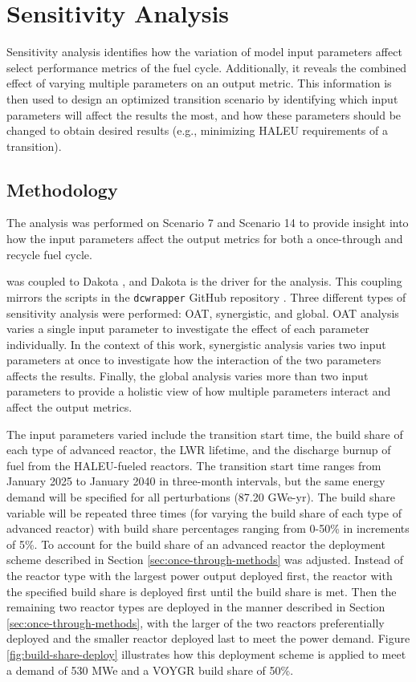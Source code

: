 \section{Sensitivity Analysis}
Sensitivity analysis identifies how the variation of model input
parameters affect select performance 
metrics of the fuel cycle. Additionally, it reveals the combined effect 
of varying multiple parameters on 
an output metric. This information is then used to design 
an optimized transition scenario by identifying which input parameters 
will affect the results the most, and how these parameters should be 
changed to obtain desired results (e.g., minimizing \gls{HALEU} requirements
of a transition). 

\subsection{Methodology}
The analysis was performed on Scenario 7 and Scenario 
14 to provide insight into how the input parameters affect the output 
metrics for both a once-through and recycle fuel cycle. 

\Cyclus was coupled to Dakota \cite{adams_dakota_2019},
and Dakota is the driver for the analysis. This coupling mirrors  
the scripts in the \texttt{dcwrapper} GitHub repository \cite{chee_arfc/dcwrapper_2019}.
Three different types 
of sensitivity analysis were performed: \acrfull{OAT}, synergistic, 
and global. \gls{OAT} analysis varies a single input parameter to 
investigate the effect of each parameter individually. In the context of 
this work, synergistic 
analysis varies two input parameters at once to investigate how the 
interaction of the two parameters affects the results. Finally, the global 
analysis varies more than two input parameters to provide a holistic 
view of how multiple parameters interact and affect the output metrics. 

The input parameters varied include the transition 
start time, the build share of each type of advanced reactor, 
the \gls{LWR} lifetime, and the discharge burnup of fuel from the 
\gls{HALEU}-fueled reactors. The transition start time ranges from January 
2025 to January 2040 in three-month intervals, but the same energy demand 
will be specified for all perturbations (87.20 GWe-yr). The build share 
variable will be repeated three times (for varying the build share of each 
type of advanced reactor) with build share percentages ranging from 0-50\% 
in increments of 5\%. To account for the build share of an advanced reactor
the deployment scheme described in Section \ref{sec:once-through-methods}
was adjusted. Instead of the reactor type with the largest power output 
deployed first, the reactor with the specified build share is deployed first 
until the build share is met. Then the remaining two reactor types are 
deployed in the manner described in Section \ref{sec:once-through-methods},
with the larger of the two reactors preferentially deployed and the smaller 
reactor deployed last to meet the power demand. Figure \ref{fig:build-share-deploy}
illustrates how this deployment scheme is applied to meet a demand of 530 
MWe and a VOYGR build share of 50\%. 


